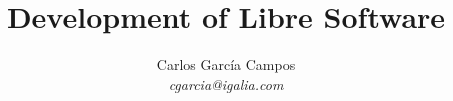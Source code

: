\documentclass{beamer}
\title{Development of Libre Software}
\subtitle{}
\author{Carlos García Campos \\{\it cgarcia@igalia.com}}
\institute{}
\date{}
\begin{document}
\begin{frame}
\titlepage
\end{frame}

%

%
%
\end{document}
